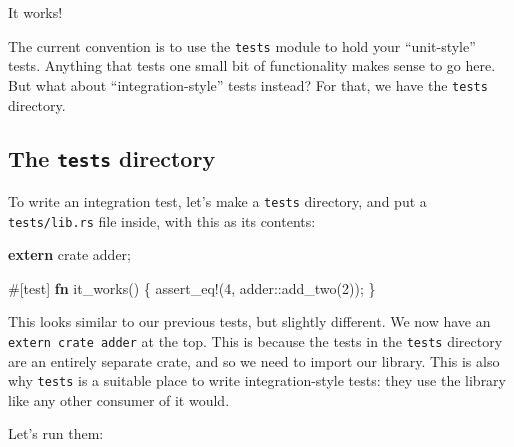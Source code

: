 \documentclass[a4paper,]{book}
\newenvironment{Shaded}{\begin{snugshade}}{\end{snugshade}}
\newcommand{\KeywordTok}[1]{\textcolor[rgb]{0.13,0.29,0.53}{\textbf{{#1}}}}
\newcommand{\DecValTok}[1]{\textcolor[rgb]{0.00,0.00,0.81}{{#1}}}
\newcommand{\OtherTok}[1]{\textcolor[rgb]{0.56,0.35,0.01}{{#1}}}
\newcommand{\NormalTok}[1]{{#1}}
\begin{document}
It works!

The current convention is to use the \texttt{tests} module to hold your
``unit-style'' tests. Anything that tests one small bit of functionality
makes sense to go here. But what about ``integration-style'' tests
instead? For that, we have the \texttt{tests} directory.

\subsection{\texorpdfstring{The \texttt{tests}
directory}{The tests directory}}\label{the-tests-directory}

To write an integration test, let's make a \texttt{tests} directory, and
put a \texttt{tests/lib.rs} file inside, with this as its contents:

\begin{Shaded}
\begin{Highlighting}[]
\KeywordTok{extern} \NormalTok{crate adder;}

\OtherTok{#[}\NormalTok{test}\OtherTok{]}
\KeywordTok{fn} \NormalTok{it_works() \{}
    \OtherTok{assert_eq!}\NormalTok{(}\DecValTok{4}\NormalTok{, adder::add_two(}\DecValTok{2}\NormalTok{));}
\NormalTok{\}}
\end{Highlighting}
\end{Shaded}

This looks similar to our previous tests, but slightly different. We now
have an \texttt{extern\ crate\ adder} at the top. This is because the
tests in the \texttt{tests} directory are an entirely separate crate,
and so we need to import our library. This is also why \texttt{tests} is
a suitable place to write integration-style tests: they use the library
like any other consumer of it would.

Let's run them:
\end{document}
